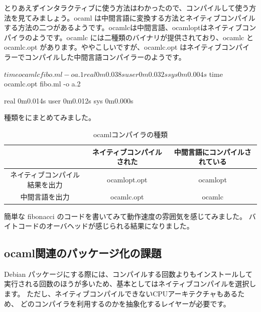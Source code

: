 \documentclass[mingoth,a4paper]{jsarticle}
\begin{document}
とりあえずインタラクティブに使う方法はわかったので、コンパイルして使う方
法を見てみましょう。ocaml は中間言語に変換する方法とネイティブコンパイル
する方法の二つがあるようです。ocamlcは中間言語、ocamloptはネイティブコン
パイラのようです。ocamlc には二種類のバイナリが提供されており、ocamlc と
ocamlc.opt があります。ややこしいですが、ocamlc.opt はネイティブコンパイ
ラーでコンパイルした中間言語コンパイラーのようです。

\begin{commandline}
$ time ocamlc fibo.ml -o a.1

real	0m0.038s
user	0m0.032s
sys	0m0.004s
$ time ocamlc.opt fibo.ml -o a.2

real	0m0.014s
user	0m0.012s
sys	0m0.000s
\end{commandline}

種類をにまとめてみました。

\begin{table}[h]
\caption{ocamlコンパイラの種類}
\label{typesofocamlcompilers}
 \begin{tabular}{|c|c|c|}
 \hline
 & ネイティブコンパイルされた & 中間言語にコンパイルされている\\
 \hline
 ネイティブコンパイル結果を出力 &
 ocamlopt.opt & ocamlopt\\
 \hline
 中間言語を出力 &
 ocamlc.opt & ocamlc \\
 \hline
 \end{tabular}
\end{table}


簡単な fibonacci のコードを書いてみて動作速度の雰囲気を感じてみました。
バイトコードのオーバヘッドが感じられる結果になりました。



\subsection{ocaml関連のパッケージ化の課題}

Debian パッケージにする際には、コンパイルする回数よりもインストールして
実行される回数のほうが多いため、基本としてはネイティブコンパイルを選択し
ます。
ただし、ネイティブコンパイルできないCPUアーキテクチャもあるため、
どのコンパイラを利用するのかを抽象化するレイヤーが必要です。
\end{document}
